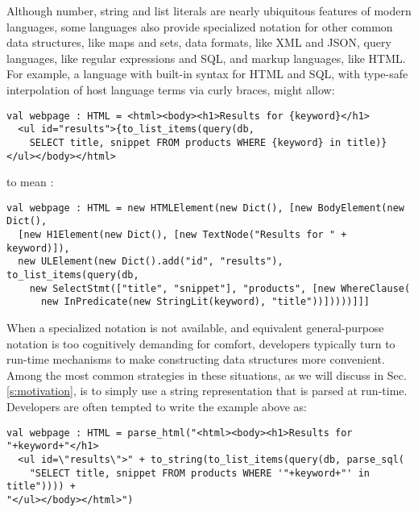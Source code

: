 Although number, string and list literals are nearly ubiquitous features of modern languages, some languages also  provide specialized notation for other common data structures, like maps and sets, data formats, like XML and JSON, query languages, like regular expressions and SQL, and markup languages, like HTML. For example, a language with built-in syntax for HTML and SQL, with type-safe interpolation of host language terms via curly braces, might allow:
\begin{lstlisting}
val webpage : HTML = <html><body><h1>Results for {keyword}</h1>
  <ul id="results">{to_list_items(query(db, 
    SELECT title, snippet FROM products WHERE {keyword} in title)}
</ul></body></html>
\end{lstlisting}
to mean :
\begin{lstlisting}
val webpage : HTML = new HTMLElement(new Dict(), [new BodyElement(new Dict(),
  [new H1Element(new Dict(), [new TextNode("Results for " + keyword)]), 
  new ULElement(new Dict().add("id", "results"), to_list_items(query(db, 
    new SelectStmt(["title", "snippet"], "products", [new WhereClause(
      new InPredicate(new StringLit(keyword), "title"))]))))]]]
\end{lstlisting}

When a specialized notation is not available, and equivalent general-purpose notation is too cognitively demanding for comfort, developers typically turn to run-time mechanisms to make constructing data structures more convenient. Among the most common strategies in these situations, as we will discuss in Sec. \ref{s:motivation}, is to simply use a string representation that is parsed at run-time. Developers are often  tempted to write the example above as:
\begin{lstlisting}
val webpage : HTML = parse_html("<html><body><h1>Results for "+keyword+"</h1>
  <ul id=\"results\">" + to_string(to_list_items(query(db, parse_sql(
  	"SELECT title, snippet FROM products WHERE '"+keyword+"' in title")))) + 
"</ul></body></html>")
\end{lstlisting}

